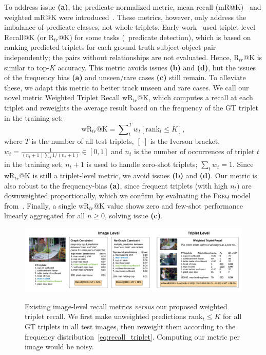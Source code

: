 To address issue \textbf{(a)}, the predicate-normalized metric, mean recall (mR@K)~\citep{chen2019knowledge,tang2019learning} and weighted mR@K were introduced~\citep{zhang2019graphical}. These metrics, however, only address the imbalance of predicate classes, not whole triplets.
Early work~\citep{lu2016visual,dai2017detecting} used triplet-level Recall@K (or R$_{tr}$@K) for some tasks (\eg~predicate detection), which is based on ranking predicted triplets for each ground truth subject-object pair independently; the pairs without relationships are not evaluated. Hence, R$_{tr}$@K is similar to top-$K$ accuracy.
This metric avoids issues \textbf{(b)} and \textbf{(d)}, but the issues of the frequency bias \textbf{(a)} and unseen/rare cases \textbf{(c)} still remain.
To alleviate these, we adapt this metric to better track unseen and rare cases. We call our novel metric Weighted Triplet Recall wR$_{tr}$@K, which computes a recall at each triplet and reweights the average result based on the frequency of the GT triplet in the training set: 
\begin{equation}
\label{eq:recall_triplet}
\text{wR}_{tr}@\text{K} =  \sum\nolimits_t^T w_t [\text{rank}_t \leq K],
\end{equation}
\noindent where $T$ is the number of all test triplets, $[\cdot]$ is the Iverson bracket, $w_t=\frac{1}{(n_t + 1)\sum_t 1/(n_t + 1)} \in [0,1]$ and $n_t$ is the number of occurrences of triplet $t$ in the training set; $n_t + 1$ is used to handle zero-shot triplets; $\sum_t w_t = 1$. Since wR$_{tr}$@K is still a triplet-level metric, we avoid issues \textbf{(b)} and \textbf{(d)}. Our metric is also robust to the frequency-bias \textbf{(a)}, since frequent triplets (with high $n_t$) are downweighted proportionally, which we confirm by evaluating the \textsc{Freq} model from~\citep{zellers2018neural}. Finally, a single wR$_{tr}$@K value shows zero and few-shot performance linearly aggregated for all $n \geq 0$, solving issue \textbf{(c)}. 

\begin{figure}%
	\centering
	{\includegraphics[width=\textwidth]{metrics.pdf}}
	\vspace{-10pt}
	\caption{\small Existing image-level recall metrics \textit{versus} our proposed weighted triplet recall. We first make unweighted predictions $\text{rank}_t \leq K$ for all GT triplets in all test images, then reweight them according to the frequency distribution~\eqref{eq:recall_triplet}. Computing our metric per image would be noisy.
	}
	\label{fig:eval}
\end{figure}

